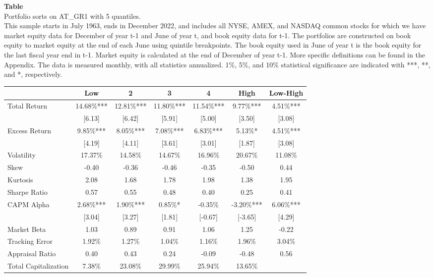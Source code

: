 \begin{table*}[ht!]
\raggedright
{}
\label{tab: summary_stats_AT_GR1_with_5_quantiles}
\textbf{Table \thetable} \\
Portfolio sorts on AT\_GR1 with 5 quantiles. \\
\hspace*{1em}This sample starts in July 1963, ends in December 2022, and includes all NYSE, AMEX, and NASDAQ common stocks for which we have market equity data for December of year t-1 and June of year t, and book equity data for t-1. The portfolios are constructed on book equity to market equity at the end of each June using quintile breakpoints.  The book equity used in June of year t is the book equity for the last fiscal year end in t-1.  Market equity is calculated at the end of December of year t-1.  More specific definitions can be found in the Appendix.  The data is measured monthly, with all statistics annualized.  1\%, 5\%, and 10\% statistical significance are indicated with ***, **, and *, respectively. \\
\vspace{0.5em}
\centering
\begin{adjustbox}{max width=\textwidth}
\begin{tabular}{@{}lcccccc@{}}
\toprule
 & Low & 2 & 3 & 4 & High & Low-High \\
\midrule
Total Return & 14.68\%*** & 12.81\%*** & 11.80\%*** & 11.54\%*** & 9.77\%*** & 4.51\%*** \\
 & [6.13] & [6.42] & [5.91] & [5.00] & [3.50] & [3.08] \\
Excess Return & 9.85\%*** & 8.05\%*** & 7.08\%*** & 6.83\%*** & 5.13\%* & 4.51\%*** \\
 & [4.19] & [4.11] & [3.61] & [3.01] & [1.87] & [3.08] \\
Volatility & 17.37\% & 14.58\% & 14.67\% & 16.96\% & 20.67\% & 11.08\% \\
Skew & -0.40 & -0.36 & -0.46 & -0.35 & -0.50 & 0.44 \\
Kurtosis & 2.08 & 1.68 & 1.78 & 1.98 & 1.38 & 1.95 \\
Sharpe Ratio & 0.57 & 0.55 & 0.48 & 0.40 & 0.25 & 0.41 \\
CAPM Alpha & 2.68\%*** & 1.90\%*** & 0.85\%* & -0.35\% & -3.20\%*** & 6.06\%*** \\
 & [3.04] & [3.27] & [1.81] & [-0.67] & [-3.65] & [4.29] \\
Market Beta & 1.03 & 0.89 & 0.91 & 1.06 & 1.25 & -0.22 \\
Tracking Error & 1.92\% & 1.27\% & 1.04\% & 1.16\% & 1.96\% & 3.04\% \\
Appraisal Ratio & 0.40 & 0.43 & 0.24 & -0.09 & -0.48 & 0.56 \\
Total Capitalization & 7.38\% & 23.08\% & 29.99\% & 25.94\% & 13.65\% &  \\
\bottomrule
\end{tabular}
\end{adjustbox}
\end{table*}